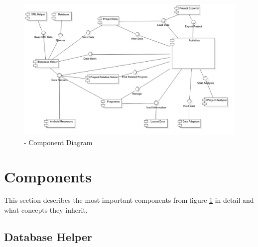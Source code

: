 \begin{figure}[h] 
	\centering 
	\includegraphics[width=14cm]{images/components.jpg} 
	\caption{- Component Diagram} 
	\label{fig:components}
\end{figure}

\section{Components}

This section describes the most important components from figure \ref{fig:components} in detail and what concepts they inherit. 

\subsection{Database Helper}

